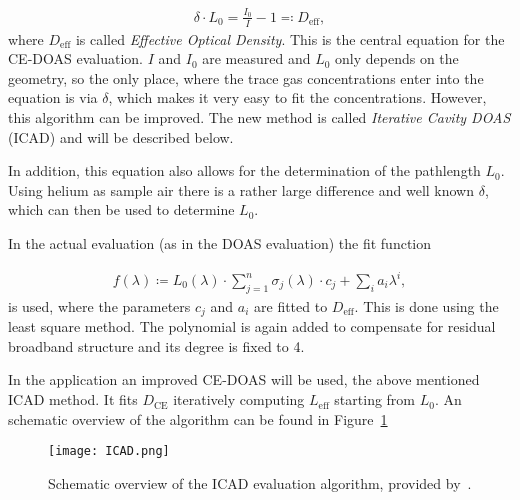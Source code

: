 \begin{align}
  \delta \cdot L_0 = \frac{I_0}{I} - 1 \eqqcolon D_{\text{eff}}, \label{eq:ce-central}
\end{align}
where $D_{\text{eff}}$ is called \emph{Effective Optical
  Density}. This is the central equation for the CE-DOAS
evaluation. $I$ and $I_0$ are measured and $L_0$ only depends on the
geometry, so the only place, where the trace gas concentrations enter
into the equation is via $\delta$, which makes it very easy to fit the
concentrations. However, this algorithm can be improved. The new
method is called \emph{Iterative Cavity DOAS} (ICAD) and will be
described below.

In addition, this equation also allows for the determination of the
pathlength $L_0$. Using helium as sample air there is a rather large
difference and well known $\delta$, which can then be used to determine
$L_0$.

In the actual evaluation (as in the DOAS evaluation) the fit function

\begin{align*}
  f(\lambda) \coloneqq L_0(\lambda)\cdot\sum_{j=1}^n \sigma_j(\lambda)
  \cdot c_j + \sum_i a_i \lambda^i,
\end{align*}
is used, where the parameters $c_j$ and $a_i$ are fitted to
$D_{\text{eff}}$. This is done using the least square method. The
polynomial is again added to compensate for residual broadband
structure and its degree is fixed to \num{4}.

In the application an improved CE-DOAS will be used, the above
mentioned ICAD method. It fits $D_{\text{CE}}$ iteratively computing
$L_{\text{eff}}$ starting from $L_0$. An schematic overview of the
algorithm can be found in Figure~\ref{fig:icad}

\begin{figure}[htbp]
  \centering
  \texttt{[image: ICAD.png]}
  \caption{Schematic overview of the ICAD evaluation algorithm,
    provided by~\cite{martin}.}
  \label{fig:icad}
\end{figure}

